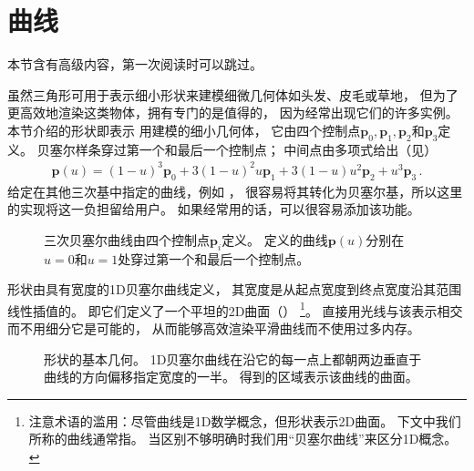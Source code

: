 \section{曲线}\label{sec:曲线}
\begin{remark}
    本节含有高级内容，第一次阅读时可以跳过。
\end{remark}

虽然三角形可用于表示细小形状来建模细微几何体如头发、皮毛或草地，
但为了更高效地渲染这类物体，拥有专门的是值得的，
因为经常出现它们的许多实例。
本节介绍的形状即表示
用建模的细小几何体，
它由四个控制点$\bm p_0,\bm p_1,\bm p_2$和$\bm p_3$定义。
贝塞尔样条穿过第一个和最后一个控制点；
中间点由多项式给出（见）
\begin{align}\label{eq:3.3}
    \bm p(u)=(1-u)^3\bm p_0+3(1-u)^2u\bm p_1+3(1-u)u^2\bm p_2+u^3\bm p_3\, .
\end{align}
给定在其他三次基中指定的曲线，例如
，
很容易将其转化为贝塞尔基，所以这里的实现将这一负担留给用户。
如果经常用的话，可以很容易添加该功能。
\begin{figure}[htbp]
    \centering
    \caption{三次贝塞尔曲线由四个控制点$\bm p_i$定义。
        \protect{}定义的曲线$\bm p(u)$分别在$u=0$和$u=1$处穿过第一个和最后一个控制点。}
    \label{fig:3.15}
\end{figure}

形状由具有宽度的1D贝塞尔曲线定义，
其宽度是从起点宽度到终点宽度沿其范围线性插值的。
即它们定义了一个平坦的2D曲面（）
\footnote{注意术语的滥用：尽管曲线是1D数学概念，但\protect{}形状表示2D曲面。
    下文中我们所称的曲线通常指\protect{}。
    当区别不够明确时我们用“贝塞尔曲线”来区分1D概念。}。
直接用光线与该表示相交而不用细分它是可能的，
从而能够高效渲染平滑曲线而不使用过多内存。
\begin{figure}[htbp]
    \centering
    \caption{\protect{}形状的基本几何。
        1D贝塞尔曲线在沿它的每一点上都朝两边垂直于曲线的方向偏移指定宽度的一半。
        得到的区域表示该曲线的曲面。}
    \label{fig:3.16}
\end{figure}

